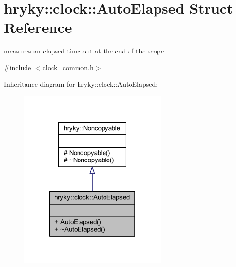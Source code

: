 \hypertarget{structhryky_1_1clock_1_1_auto_elapsed}{\section{hryky\-:\-:clock\-:\-:Auto\-Elapsed Struct Reference}
\label{structhryky_1_1clock_1_1_auto_elapsed}
}


measures an elapsed time out at the end of the scope.  




{\ttfamily \#include $<$clock\-\_\-common.\-h$>$}



Inheritance diagram for hryky\-:\-:clock\-:\-:Auto\-Elapsed\-:\nopagebreak
\begin{figure}[H]
\begin{center}
\leavevmode
\includegraphics[width=210pt]{structhryky_1_1clock_1_1_auto_elapsed__inherit__graph}
\end{center}
\end{figure}
